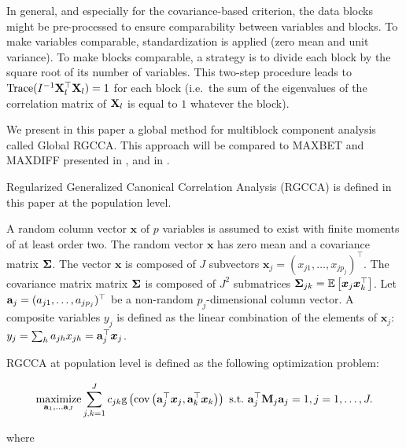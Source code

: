 \documentclass[
]{jss}
\begin{document}
In general, and especially for the covariance-based criterion, the data
blocks might be pre-processed to ensure comparability between variables
and blocks. To make variables comparable, standardization is applied
(zero mean and unit variance). To make blocks comparable, a strategy is
to divide each block by the square root of its number of variables. This
two-step procedure leads to \(\text{Trace}(I^{-1}\mathbf{X}_l^\top \mathbf{X}_l) = 1\)
for each block (i.e.~the sum of the eigenvalues of the correlation
matrix of \(\mathbf{X}_l\) is equal to \(1\) whatever the block).

We present in this paper a global method for multiblock component
analysis called Global RGCCA. This approach will be compared to MAXBET
and MAXDIFF presented in \cite{Van1984}, \cite{TenBerg1988} and in
\cite{Hanafi2006}.

Regularized Generalized Canonical Correlation Analysis (RGCCA) is
defined in this paper at the population level.

A random column vector \(\boldsymbol x\) of \(p\) variables is assumed
to exist with finite moments of at least order two. The random vector
\(\boldsymbol x\) has zero mean and a covariance matrix \(\mathbf{\Sigma}\).
The vector \(\boldsymbol x\) is composed of \(J\) subvectors
\(\boldsymbol x_j = (x_{j1}, \ldots, x_{jp_j})^\top\). The covariance
matrix matrix \(\mathbf{\Sigma}\) is composed of \(J^2\) submatrices
\(\mathbf{\Sigma}_{jk} = \mathbb{E}\left[\boldsymbol x_j \boldsymbol x_k^\top\right]\).
Let \(\mathbf{a}_j = (a_{j1}, \ldots, a_{jp_j})^\top\) be a non-random
\(p_j\)-dimensional column vector. A composite variables \(y_j\) is
defined as the linear combination of the elements of
\(\boldsymbol x_j\):
\(y_j = \sum_h a_{jh}x_{jh} = \mathbf{a}_j^\top \boldsymbol x_j\).

RGCCA at population level is defined as the following optimization
problem:

\begin{equation}
\underset{\mathbf{a}_1, \ldots \mathbf{a}_J}{\text{maximize}} \sum_{j,k=1}^J c_{jk} \text{g}\left(\text{cov}\left(\mathbf{a}_j^\top \boldsymbol x_j, \mathbf{a}_k^\top \boldsymbol x_k \right)\right) \text{~s.t.~} \mathbf{a}_j^\top \mathbf{M}_j \mathbf{a}_j = 1,  j=1, \ldots, J.
\label{RGCCA_optim}
\end{equation}

where
\end{document}
